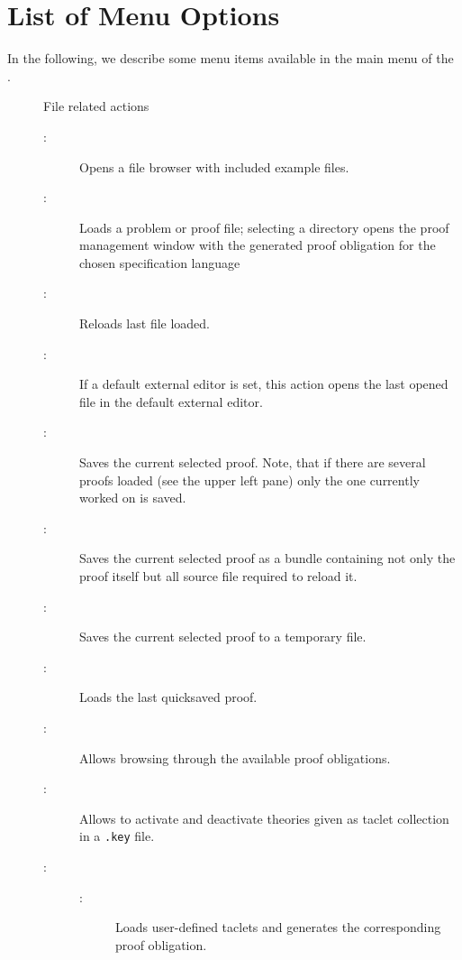 \appendix

\section{List of Menu Options}
\label{app:menuOptions}

In the following, we describe some menu items available in the main menu
of the \kp.

\begin{description}

\item[] File related actions
  \begin{description}
  \item[:] Opens a file browser with included example files.
  \item[:] Loads a problem or proof file; selecting a
    directory opens the proof management window with the generated
    proof obligation for the chosen specification language
  \item[:] Reloads last file loaded.
  \item[:] If a default external editor is set, 
  this action opens the last opened file in the default external editor.  

  \item[:] Saves the current selected proof. Note, that if
    there are several proofs loaded (see the upper left pane) only the one
    currently worked on is saved. 
   \item[:] Saves the current selected proof as a bundle containing not only the proof itself but all source file required to reload it.
   \item[:] Saves the current selected proof to a temporary file.
   \item[:] Loads the last quicksaved proof.
    
  \item[:] Allows browsing through the
    available proof obligations.
  \item[:] Allows to activate and deactivate
    theories given as taclet collection in a \texttt{.key} file.
  \item[:]
  \begin{description}
    \item[:] Loads user-defined taclets 
    and generates the corresponding proof obligation.
      

\end{description}
\end{description}
\end{description}
